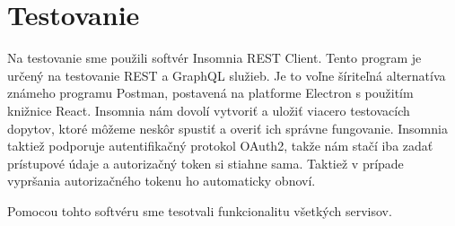   

\section{Testovanie} 

 Na testovanie sme použili softvér Insomnia REST Client\cite{insomnia}. Tento program je určený na testovanie REST a GraphQL služieb. Je to voľne šíriteľná alternatíva známeho programu Postman, postavená na platforme Electron s použitím knižnice React. Insomnia nám dovolí vytvoriť a uložiť viacero testovacích dopytov, ktoré môžeme neskôr spustiť a overiť ich správne fungovanie. Insomnia taktiež podporuje autentifikačný protokol OAuth2, takže nám stačí iba zadať prístupové údaje a autorizačný token si stiahne sama. Taktiež v prípade vypršania autorizačného tokenu ho automaticky obnoví. 
 
 Pomocou tohto softvéru sme tesotvali funkcionalitu všetkých servisov.

